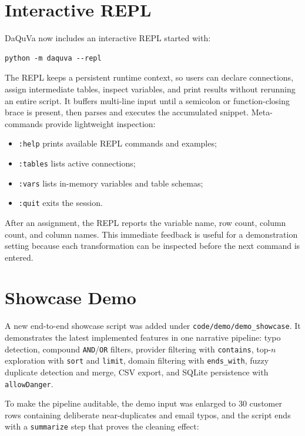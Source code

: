 \section{Interactive REPL}

DaQuVa now includes an interactive REPL started with:

\begin{lstlisting}[style=dsl]
python -m daquva --repl
\end{lstlisting}

The REPL keeps a persistent runtime context, so users can declare connections,
assign intermediate tables, inspect variables, and print results without
rerunning an entire script. It buffers multi-line input until a semicolon or
function-closing brace is present, then parses and executes the accumulated
snippet. Meta-commands provide lightweight inspection:

\begin{itemize}[label=-, noitemsep]
    \item \texttt{:help} prints available REPL commands and examples;
    \item \texttt{:tables} lists active connections;
    \item \texttt{:vars} lists in-memory variables and table schemas;
    \item \texttt{:quit} exits the session.
\end{itemize}

After an assignment, the REPL reports the variable name, row count, column
count, and column names. This immediate feedback is useful for a demonstration
setting because each transformation can be inspected before the next command is
entered.

\section{Showcase Demo}

A new end-to-end showcase script was added under
\texttt{code/demo/demo\_showcase}. It demonstrates the latest implemented
features in one narrative pipeline: typo detection, compound
\texttt{AND}/\texttt{OR} filters, provider filtering with \texttt{contains},
top-$n$ exploration with \texttt{sort} and \texttt{limit}, domain filtering
with \texttt{ends\_with}, fuzzy duplicate detection and merge, CSV export, and
SQLite persistence with \texttt{allowDanger}.

To make the pipeline auditable, the demo input was enlarged to 30 customer rows
containing deliberate near-duplicates and email typos, and the script ends with
a \texttt{summarize} step that proves the cleaning effect:

